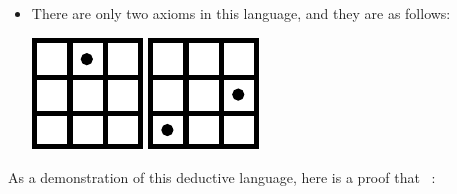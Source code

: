 \documentclass[12pt]{article}
\def\pA{\Phi}
\def\pB{\Psi}
\begin{document}
{\begin{itemize}
which contains a dot in any square that has a dot in either $\pA$ or $\pB$, but not both.
So for example if you have the two propositions
and
,
then you can deduce from them that
.
\item There are only two axioms in this language, and they are as follows:
\begin{center}
\includegraphics[scale=\s]{img/gridgame/gridgame8.pdf}
\hspace{2em}
\includegraphics[scale=\s]{img/gridgame/gridgame9.pdf}
\end{center}
\end{itemize}
As a demonstration of this deductive language, here is a proof that 
\ :
}
\end{document}
